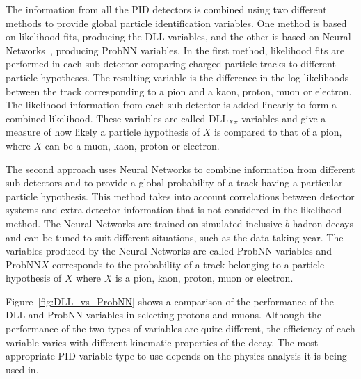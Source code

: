 The information from all the PID detectors is combined using two different methods to provide global particle identification variables. One method is based on likelihood fits, producing the DLL variables, and the other is based on Neural Networks~\cite{Feindt:2006pm}, producing ProbNN variables. In the first method, likelihood fits are performed in each sub-detector comparing charged particle tracks to different particle hypotheses. The resulting variable is the difference in the log-likelihoods between the track corresponding to a pion and a kaon, proton, muon or electron. The likelihood information from each sub detector is added linearly to form a combined likelihood. 
These variables are called DLL$_{X\pi}$ variables and give a measure of how likely a particle hypothesis of $X$ is compared to that of a pion, where $X$ can be a muon, kaon, proton or electron.

The second approach uses Neural Networks to combine information from different sub-detectors and to provide a global probability of a track having a particular particle hypothesis. This method takes into account correlations between detector systems and extra detector information that is not considered in the likelihood method. The Neural Networks are trained on simulated inclusive $b$-hadron decays and can be tuned to suit different situations, such as the data taking year. The variables produced by the Neural Networks are called ProbNN variables and ProbNN$X$ corresponds to the probability of a track belonging to a particle hypothesis of $X$ where $X$ is a pion, kaon, proton, muon or electron. 

Figure~\ref{fig:DLL_vs_ProbNN} shows a comparison of the performance of the DLL and ProbNN variables in selecting protons and muons. Although the performance of the two types of variables are quite different, the efficiency of each variable varies with different kinematic properties of the decay. The most appropriate PID variable type to use depends on the physics analysis it is being used in. 

